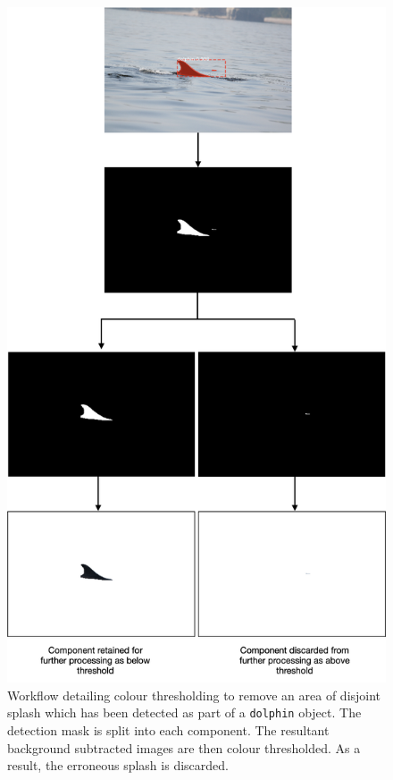 \begin{figure}
	\begin{center}
		\includegraphics[scale=0.5]{Chapter4/figs/190827-001-MOLS0078_-colour-thresholding-splash-removed.png}
	\end{center}
	\caption{Workflow detailing colour thresholding to remove an area of disjoint splash which has been detected as part of a \texttt{dolphin} object. The detection mask is split into each component. The resultant background subtracted images are then colour thresholded. As a result, the erroneous splash is discarded. }\label{fig:190827-001-MOLS0078_-colour-thresholding-splash-removed}
\end{figure}

